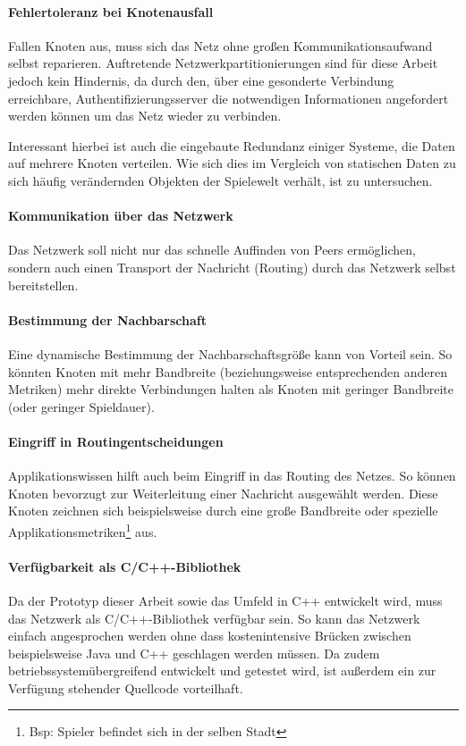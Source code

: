 \paragraph{Fehlertoleranz bei Knotenausfall} Fallen Knoten aus, muss sich das Netz ohne großen Kommunikationsaufwand selbst reparieren. Auftretende Netzwerkpartitionierungen sind für diese Arbeit jedoch kein Hindernis, da durch den, über eine gesonderte Verbindung erreichbare, Authentifizierungsserver die notwendigen Informationen angefordert werden können um das Netz wieder zu verbinden.

Interessant hierbei ist auch die eingebaute Redundanz einiger Systeme, die Daten auf mehrere Knoten verteilen. Wie sich dies im Vergleich von statischen Daten zu sich häufig verändernden Objekten der Spielewelt verhält, ist zu untersuchen. 

\paragraph{Kommunikation über das Netzwerk} Das Netzwerk soll nicht nur das schnelle Auffinden von Peers ermöglichen, sondern auch einen Transport der Nachricht (Routing) durch das Netzwerk selbst bereitstellen.

\paragraph{Bestimmung der Nachbarschaft} Eine dynamische Bestimmung der Nachbarschaftsgröße kann von Vorteil sein. So könnten Knoten mit mehr Bandbreite (beziehungsweise entsprechenden anderen Metriken) mehr direkte Verbindungen halten als Knoten mit geringer Bandbreite (oder geringer Spieldauer).

\paragraph{Eingriff in Routingentscheidungen} Applikationswissen hilft auch beim Eingriff in das Routing des Netzes. So können Knoten bevorzugt zur Weiterleitung einer Nachricht ausgewählt werden. Diese Knoten zeichnen sich beispielsweise durch eine große Bandbreite oder spezielle Applikationsmetriken\footnote{Bsp: Spieler befindet sich in der selben Stadt} aus.

\paragraph{Verfügbarkeit als C/C++-Bibliothek} Da der Prototyp dieser Arbeit sowie das Umfeld in C++ entwickelt wird, muss das Netzwerk als C/C++-Bibliothek verfügbar sein. So kann das Netzwerk einfach angesprochen werden ohne dass kostenintensive Brücken zwischen beispielsweise Java und C++ geschlagen werden müssen. Da zudem betriebssystemübergreifend entwickelt und getestet wird, ist außerdem ein zur Verfügung stehender Quellcode vorteilhaft.

